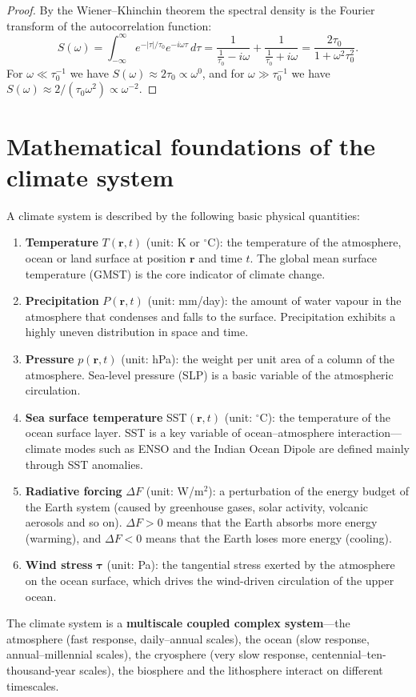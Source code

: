 \begin{proof}
By the Wiener--Khinchin theorem the spectral density is the Fourier transform of the autocorrelation function:
\[
S(\omega) = \int_{-\infty}^{\infty} e^{-|\tau|/\tau_0} e^{-i\omega\tau}\, d\tau
= \frac{1}{\frac{1}{\tau_0} - i\omega} + \frac{1}{\frac{1}{\tau_0} + i\omega} = \frac{2\tau_0}{1+\omega^2\tau_0^2}.
\]
For $\omega \ll \tau_0^{-1}$ we have $S(\omega) \approx 2\tau_0 \propto \omega^{0}$, and for $\omega \gg \tau_0^{-1}$ we have $S(\omega) \approx 2/(\tau_0 \omega^2) \propto \omega^{-2}$.
\end{proof}

\section{Mathematical foundations of the climate system}

\begin{definition}\label{def:climate_quantities}
A climate system is described by the following basic physical quantities:
\begin{enumerate}[label=(\roman*)]
    \item \textbf{Temperature} $T(\mathbf{r}, t)$ (unit: K or $^\circ$C): the temperature of the atmosphere, ocean or land surface at position $\mathbf{r}$ and time $t$. The global mean surface temperature (GMST) is the core indicator of climate change.
    \item \textbf{Precipitation} $P(\mathbf{r}, t)$ (unit: mm/day): the amount of water vapour in the atmosphere that condenses and falls to the surface. Precipitation exhibits a highly uneven distribution in space and time.
    \item \textbf{Pressure} $p(\mathbf{r}, t)$ (unit: hPa): the weight per unit area of a column of the atmosphere. Sea-level pressure (SLP) is a basic variable of the atmospheric circulation.
    \item \textbf{Sea surface temperature} SST$(\mathbf{r}, t)$ (unit: $^\circ$C): the temperature of the ocean surface layer. SST is a key variable of ocean--atmosphere interaction---climate modes such as ENSO and the Indian Ocean Dipole are defined mainly through SST anomalies.
    \item \textbf{Radiative forcing} $\Delta F$ (unit: W/m$^2$): a perturbation of the energy budget of the Earth system (caused by greenhouse gases, solar activity, volcanic aerosols and so on). $\Delta F > 0$ means that the Earth absorbs more energy (warming), and $\Delta F < 0$ means that the Earth loses more energy (cooling).
    \item \textbf{Wind stress} $\boldsymbol{\tau}$ (unit: Pa): the tangential stress exerted by the atmosphere on the ocean surface, which drives the wind-driven circulation of the upper ocean.
\end{enumerate}
The climate system is a \textbf{multiscale coupled complex system}---the atmosphere (fast response, daily--annual scales), the ocean (slow response, annual--millennial scales), the cryosphere (very slow response, centennial--ten-thousand-year scales), the biosphere and the lithosphere interact on different timescales.
\end{definition}

